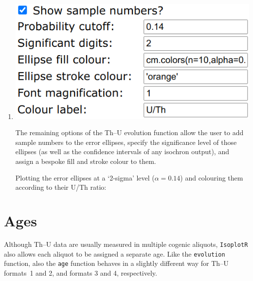 \begin{refsection}
\begin{enumerate}
\item\begin{minipage}[t]{.45\linewidth}
    \strut\vspace*{-\baselineskip}\newline
    \includegraphics[width=\linewidth]{../figures/ThUevolutionOtherOptions.png}
  \end{minipage}
  \begin{minipage}[t]{.55\linewidth}
    The remaining options of the Th--U evolution function allow the
    user to add sample numbers to the error ellipses, specify the
    significance level of those ellipses (as well as the confidence
    intervals of any isochron output), and assign a bespoke fill and
    stroke colour to them.
  \end{minipage}

  Plotting the error ellipses at a `2-sigma' level ($\alpha=0.14$) and
  colouring them according to their U/Th ratio:


\end{enumerate}

\section{Ages}\label{sec:ThU-ages-R}

Although Th--U data are usually measured in multiple cogenic aliquots,
\texttt{IsoplotR} also allows each aliquot to be assigned a separate
age. Like the \texttt{evolution} function, also the \texttt{age}
function behaves in a slightly different way for Th--U formats~1 and
2, and formats 3 and 4, respectively.


\end{refsection}
